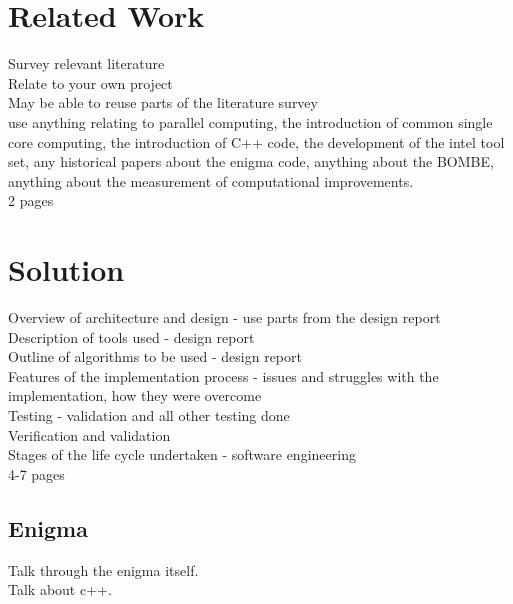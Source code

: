 \documentclass[12pt,a4paper]{article}
\begin{document}
\section{Related Work}

Survey relevant literature\\
Relate to your own project\\
May be able to reuse parts of the literature survey\\
use anything relating to parallel computing, the introduction of common single core computing, the introduction of C++ code, the development of the intel tool set, any historical papers about the enigma code, anything about the BOMBE, anything about the measurement of computational improvements.\\
2 pages

\section{Solution}

Overview of architecture and design - use parts from the design report\\
Description of tools used - design report\\
Outline of algorithms to be used - design report\\
Features of the implementation process - issues and struggles with the implementation, how they were overcome\\
Testing - validation and all other testing done\\
Verification and validation\\
Stages of the life cycle undertaken - software engineering\\
4-7 pages\\

\subsection{Enigma}

Talk through the enigma itself.\\
Talk about c++.\\
\end{document}
